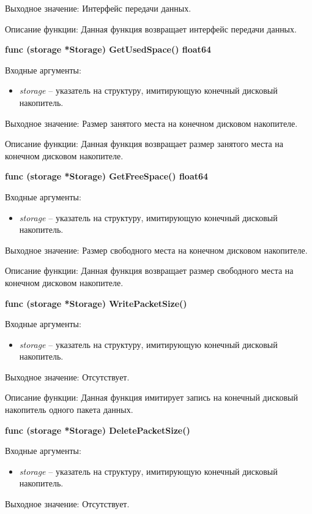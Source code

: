 Выходное значение: Интерфейс передачи данных. 

Описание функции: Данная функция возвращает интерфейс передачи данных.

\textbf{func (storage *Storage) GetUsedSpace() float64 }

Входные аргументы: 
\begin{itemize}
	\item \textit{storage} -- указатель на структуру, имитирующую конечный дисковый накопитель.
\end{itemize}

Выходное значение:  Размер занятого места на конечном дисковом накопителе.

Описание функции: Данная функция возвращает размер занятого места на конечном дисковом накопителе.

\textbf{func (storage *Storage) GetFreeSpace() float64}

Входные аргументы: 
\begin{itemize}
	\item \textit{storage} -- указатель на структуру, имитирующую конечный дисковый накопитель.
\end{itemize}

Выходное значение: Размер свободного места на конечном дисковом накопителе.

Описание функции: Данная функция возвращает размер свободного места на конечном дисковом накопителе.

\textbf{func (storage *Storage) WritePacketSize() }

Входные аргументы: 
\begin{itemize}
	\item \textit{storage} -- указатель на структуру, имитирующую конечный дисковый накопитель.
\end{itemize}

Выходное значение: Отсутствует.

Описание функции: Данная функция имитирует запись на конечный дисковый накопитель одного пакета данных.

\textbf{func (storage *Storage) DeletePacketSize()}

Входные аргументы: 
\begin{itemize}
	\item \textit{storage} -- указатель на структуру, имитирующую конечный дисковый накопитель.
\end{itemize}

Выходное значение: Отсутствует.

